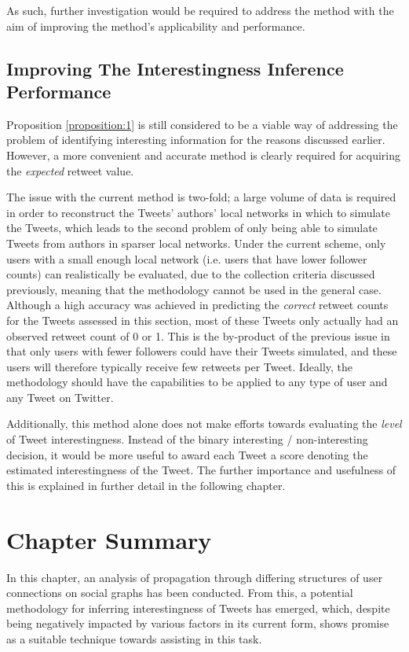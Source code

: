 As such, further investigation would be required to address the method with the aim of improving the method's applicability and performance. 


\subsection{Improving The Interestingness Inference Performance}
Proposition \ref{proposition:1} is still considered to be a viable way of addressing the problem of identifying interesting information for the reasons discussed earlier. However, a more convenient and accurate method is clearly required for acquiring the \textit{expected} retweet value.

The issue with the current method is two-fold; a large volume of data is required in order to reconstruct the Tweets' authors' local networks in which to simulate the Tweets, which leads to the second problem of only being able to simulate Tweets from authors in sparser local networks. Under the current scheme, only users with a small enough local network (i.e. users that have lower follower counts) can realistically be evaluated, due to the collection criteria discussed previously, meaning that the methodology cannot be used in the general case. Although a high accuracy was achieved in predicting the \textit{correct} retweet counts for the Tweets assessed in this section, most of these Tweets only actually had an observed retweet count of 0 or 1. This is the by-product of the previous issue in that only users with fewer followers could have their Tweets simulated, and these users will therefore typically receive few retweets per Tweet. Ideally, the methodology should have the capabilities to be applied to any type of user and any Tweet on Twitter.

Additionally, this method alone does not make efforts towards evaluating the \textit{level} of Tweet interestingness. Instead of the binary interesting / non-interesting decision, it would be more useful to award each Tweet a score denoting the estimated interestingness of the Tweet. The further importance and usefulness of this is explained in further detail in the following chapter.


\section{Chapter Summary}
In this chapter, an analysis of propagation through differing structures of user connections on social graphs has been conducted. From this, a potential methodology for inferring interestingness of Tweets has emerged, which, despite being negatively impacted by various factors in its current form, shows promise as a suitable technique towards assisting in this task. 

